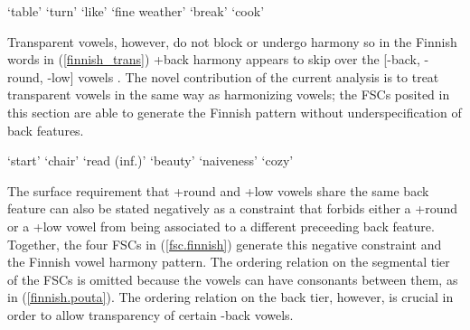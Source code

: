 \documentclass[,doc,floatsintext]{apa6}
\theoremstyle{definition}
\theoremstyle{definition}
\theoremstyle{definition}
\theoremstyle{remark}
\begin{document}
\begin{exe}
\label{finnish_-neutral}
\begin{xlist}
  \ex {} `table'
  \ex {} `turn'
  \ex {} `like'
  \ex {} `fine weather'
  \ex {} `break'
  \ex {} `cook'
  \end{xlist}
\end{exe}

Transparent vowels, however, do not block or undergo harmony so in the
Finnish words in (\ref{finnish_trans}) +back harmony appears to skip
over the {[}-back, -round, -low{]} vowels \textipa{[i, i:, e, e:]}. The
novel contribution of the current analysis is to treat transparent
vowels in the same way as harmonizing vowels; the FSCs posited in this
section are able to generate the Finnish pattern without
underspecification of back features.

\begin{exe}
\label{finnish_trans}
\begin{xlist}
  \ex {} `start'
  \ex {} `chair'
  \ex {} `read (inf.)'
  \ex {} `beauty'
  \ex {} `naiveness'
  \ex {} `cozy'
  \end{xlist}
\end{exe}

The surface requirement that +round and +low vowels share the same back
feature can also be stated negatively as a constraint that forbids
either a +round or a +low vowel from being associated to a different
preceeding back feature. Together, the four FSCs in (\ref{fsc.finnish})
generate this negative constraint and the Finnish vowel harmony pattern.
The ordering relation on the segmental tier of the FSCs is omitted
because the vowels can have consonants between them, as in
(\ref{finnish.pouta}). The ordering relation on the back tier, however,
is crucial in order to allow transparency of certain -back vowels.
\end{document}
